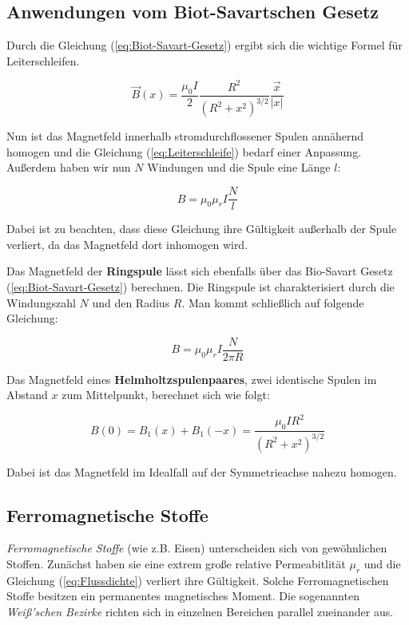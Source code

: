 \subsection{Anwendungen vom Biot-Savartschen Gesetz}

Durch die Gleichung (\ref{eq:Biot-Savart-Gesetz}) ergibt sich die wichtige Formel für Leiterschleifen.

\begin{equation} \label{eq:Leiterschleife}
    \vec{B}(x) = \frac{\mu_{0}I}{2} \frac{R^2}{(R^2 + x^2)^{3/2}} \frac{\vec{x}}{|x|}
\end{equation}

Nun ist das Magnetfeld innerhalb stromdurchflossener Spulen annähernd homogen und die Gleichung (\ref{eq:Leiterschleife}) bedarf einer Anpassung.
Außerdem haben wir nun $N$ Windungen und die Spule eine Länge $l$:

\begin{equation} \label{eq:LangeSpule}
    B = \mu_{0}\mu_{r}I \frac{N}{l}
\end{equation}

Dabei ist zu beachten, dass diese Gleichung ihre Gültigkeit außerhalb der Spule verliert, da das Magnetfeld dort inhomogen wird.

Das Magnetfeld der \textbf{Ringspule} lässt sich ebenfalls über das Bio-Savart Gesetz (\ref{eq:Biot-Savart-Gesetz}) berechnen.
Die Ringspule ist charakterisiert durch die Windungszahl $N$ und den Radius $R$.
Man kommt schließlich auf folgende Gleichung:

\begin{equation}
    B = \mu_{0}\mu_{r}I \frac{N}{2\pi R}
\end{equation}

Das Magnetfeld eines \textbf{Helmholtzspulenpaares}, zwei identische Spulen im Abstand $x$ zum Mittelpunkt, berechnet sich wie folgt:

\begin{equation} \label{eq:Helmholtzgleichung}
    B(0) =  B_{1}(x) +  B_{1}(-x) = \frac {\mu_{0} I R^2} {(R^2 + x^2)^{3/2}}
\end{equation}

Dabei ist das Magnetfeld im Idealfall auf der Symmetrieachse nahezu homogen.

\subsection{Ferromagnetische Stoffe}
\textit{Ferromagnetische Stoffe} (wie z.B. Eisen) unterscheiden sich von gewöhnlichen Stoffen.
Zunächst haben sie eine extrem große relative Permeabitlität $\mu_{r}$ und die Gleichung (\ref{eq:Flussdichte}) verliert ihre Gültigkeit.
Solche Ferromagnetischen Stoffe besitzen ein permanentes magnetisches Moment.
Die sogenannten \textit{Weiß'schen Bezirke} richten sich in einzelnen Bereichen parallel zueinander aus.





